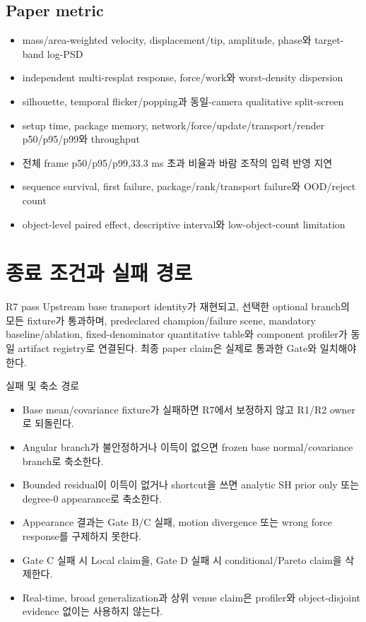 \documentclass[10pt]{article}
\begin{document}
\subsection{Paper metric}

\begin{itemize}
  \item mass/area-weighted velocity, displacement/tip, amplitude, phase와 target-band log-PSD
  \item independent multi-resplat response, force/work와 worst-density dispersion
  \item silhouette, temporal flicker/popping과 동일-camera qualitative split-screen
  \item setup time, package memory, network/force/update/transport/render p50/p95/p99와 throughput
  \item 전체 frame p50/p95/p99,33.3 ms 초과 비율과 바람 조작의 입력 반영 지연
  \item sequence survival, first failure, package/rank/transport failure와 OOD/reject count
  \item object-level paired effect, descriptive interval와 low-object-count limitation
\end{itemize}

\section{종료 조건과 실패 경로}
\label{sec:r7-chapter-8}

\begin{contractbox}{R7 pass}
Upstream base transport identity가 재현되고, 선택한 optional branch의 모든 fixture가 통과하며,
predeclared champion/failure scene, mandatory baseline/ablation, fixed-denominator quantitative table와
component profiler가 동일 artifact registry로 연결된다. 최종 paper claim은 실제로 통과한 Gate와 일치해야 한다.
\end{contractbox}

\begin{stopbox}{실패 및 축소 경로}
\begin{itemize}
  \item Base mean/covariance fixture가 실패하면 R7에서 보정하지 않고 R1/R2 owner로 되돌린다.
  \item Angular branch가 불안정하거나 이득이 없으면 frozen base normal/covariance branch로 축소한다.
  \item Bounded residual이 이득이 없거나 shortcut을 쓰면 analytic SH prior only 또는 degree-0 appearance로 축소한다.
  \item Appearance 결과는 Gate B/C 실패, motion divergence 또는 wrong force response를 구제하지 못한다.
  \item Gate C 실패 시 Local claim을, Gate D 실패 시 conditional/Pareto claim을 삭제한다.
  \item Real-time, broad generalization과 상위 venue claim은 profiler와 object-disjoint evidence 없이는 사용하지 않는다.
\end{itemize}
\end{stopbox}
\end{document}
